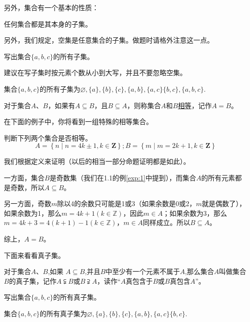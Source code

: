 \documentclass[lang=cn,math=cm,chinesefont=nofont,11pt,scheme=chinese,onecol]{elegantbook}
\begin{document}
  另外，集合有一个基本的性质：
\begin{property}
  任何集合都是其本身的子集。
\end{property}

另外，我们规定，空集是任意集合的子集。做题时请格外注意这一点。

\begin{example}
  写出集合$\{a,b,c\}$的所有子集。
\end{example}
\begin{remark}
  建议在写子集时按元素个数从小到大写，并且不要忽略空集。
\end{remark}
\begin{solution}
  集合$\{a,b,c\}$的所有子集为$\varnothing ,\{a\},\{b\},\{c\},\{a,b\},\{a,c\}\{b,c\},\{a,b,c\}$.
\end{solution}
\begin{definition}[集合的相等]
  对于集合$A$、$B$，如果有$A\subseteq B$，且$B\subseteq A$，则称集合$A$和$B$\underline{相等}，记作$A=B$。
\end{definition}

在下面的例子中，你将看到一组特殊的相等集合。

\begin{example}\label{exp:2}
  判断下列两个集合是否相等。
  $$A=\left\{n\mid n=4k\pm1,k\in\mathbf{Z}\right\};B=\left\{m\mid m=2k+1,k\in\mathbf{Z}\right\}$$
\end{example}
\begin{solution}
  我们根据定义来证明（以后的相当一部分命题证明都是如此）。

一方面，集合$B$是奇数集（我们在1.1的例\ref{exp:1}中提到），而集合$A$的所有元素都是奇数，所以$A\subseteq B$。

另一方面，奇数$m$除以4的余数只可能是1或3（如果余数是0或2，$m$就是偶数了），如果余数为1，那么$m=4k+1(k\in\mathbb{Z})$，因此$m\in A$；如果余数为3，那么$m=4k+3=4(k+1)-1(k\in\mathbb{Z})$，$m\in A$同样成立。所以$B\subseteq A$。

综上，$A=B$。
\end{solution}

下面来看看真子集。
\begin{definition}[真子集]
  对于集合$A$、$B$,如果 $A\subseteq B$,并且$B$中至少有一个元素不属于$A$,那么集合$A$叫做集合$B$的真子集，记作$A\subsetneqq B$或$B\supsetneqq A$，读作“$A$真包含于$B$或$B$真包含$A$”。
\end{definition}

\begin{example}
  写出集合$\{a,b,c\}$的所有真子集。
\end{example}
\begin{solution}集合$\{a,b,c\}$的所有真子集为$\varnothing ,\{a\},\{b\},\{c\},\{a,b\},\{a,c\}\{b,c\}$.
\end{solution}
\end{document}
